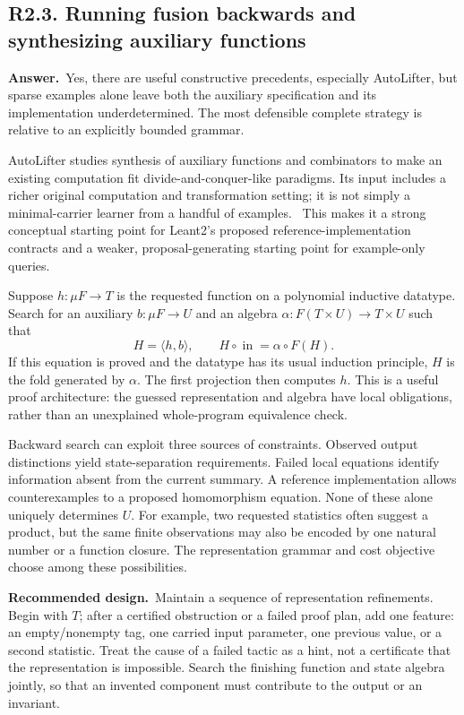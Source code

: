 \documentclass[11pt,a4paper]{article}
\newcommand{\qid}[3]{\subsection{#2. #3}\label{#1}}
\newcommand{\answer}{\noindent\textbf{Answer.}\ }
\newcommand{\proposal}{\noindent\textbf{Recommended design.}\ }
\theoremstyle{remark}
\begin{document}
\qid{q23}{R2.3}{Running fusion backwards and synthesizing auxiliary functions}
\answer Yes, there are useful constructive precedents, especially AutoLifter, but sparse examples alone leave both the auxiliary specification and its implementation underdetermined. The most defensible complete strategy is relative to an explicitly bounded grammar.

AutoLifter studies synthesis of auxiliary functions and combinators to make an existing computation fit divide-and-conquer-like paradigms. Its input includes a richer original computation and transformation setting; it is not simply a minimal-carrier learner from a handful of examples.~\cite{autolifter} This makes it a strong conceptual starting point for Leant2's proposed reference-implementation contracts and a weaker, proposal-generating starting point for example-only queries.

Suppose $h:\mu F\to T$ is the requested function on a polynomial inductive datatype. Search for an auxiliary $b:\mu F\to U$ and an algebra $\alpha:F(T\times U)\to T\times U$ such that
\[
 H=\langle h,b\rangle,
 \qquad H\circ\operatorname{in}=\alpha\circ F(H).
\]
If this equation is proved and the datatype has its usual induction principle, $H$ is the fold generated by $\alpha$. The first projection then computes $h$. This is a useful proof architecture: the guessed representation and algebra have local obligations, rather than an unexplained whole-program equivalence check.

Backward search can exploit three sources of constraints. Observed output distinctions yield state-separation requirements. Failed local equations identify information absent from the current summary. A reference implementation allows counterexamples to a proposed homomorphism equation. None of these alone uniquely determines $U$. For example, two requested statistics often suggest a product, but the same finite observations may also be encoded by one natural number or a function closure. The representation grammar and cost objective choose among these possibilities.

\proposal Maintain a sequence of representation refinements. Begin with $T$; after a certified obstruction or a failed proof plan, add one feature: an empty/nonempty tag, one carried input parameter, one previous value, or a second statistic. Treat the cause of a failed tactic as a hint, not a certificate that the representation is impossible. Search the finishing function and state algebra jointly, so that an invented component must contribute to the output or an invariant.
\end{document}
